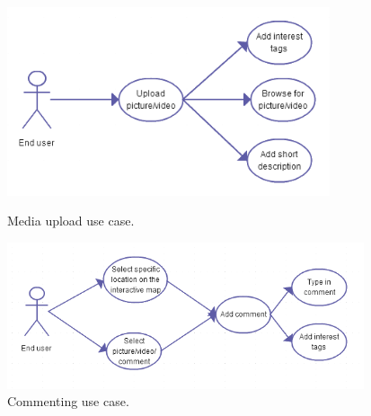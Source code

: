 \begin{figure}
	\includegraphics[width=95mm]{./SystemRequirements/img/uploadUC.png}
	\caption{Media upload use case. \label{fig:SysReqUseCasesMediaUpload}}
	\includegraphics[width=105mm]{./SystemRequirements/img/commentUC.png}
	\caption{Commenting use case. \label{fig:SysReqUseCasesComment}}
\end{figure}



